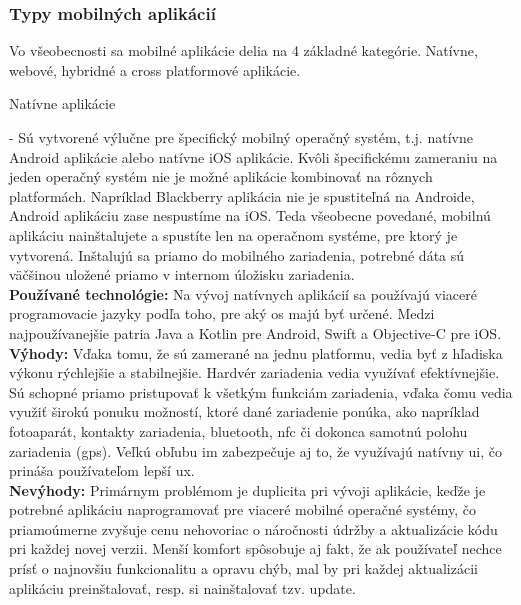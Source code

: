 \subsubsection{Typy mobilných aplikácií}
\label{sec:typy aplikacii}
Vo všeobecnosti sa mobilné aplikácie delia na 4 základné kategórie. Natívne, webové, hybridné a cross platformové aplikácie.
\begin{itemize}[leftmargin=*]
{\bf \item Natívne aplikácie} - Sú vytvorené výlučne pre špecifický mobilný operačný systém, t.j. natívne Android aplikácie alebo natívne iOS aplikácie. Kvôli špecifickému zameraniu na jeden operačný systém nie je možné aplikácie kombinovať na rôznych platformách. Napríklad Blackberry aplikácia nie je spustiteľná na Androide, Android aplikáciu zase nespustíme na iOS. Teda všeobecne povedané, mobilnú aplikáciu nainštalujete a spustíte len na operačnom systéme, pre ktorý je vytvorená. Inštalujú sa priamo do mobilného zariadenia, potrebné dáta sú väčšinou uložené priamo v internom úložisku zariadenia. \cite{ma3} \\

{\bf Používané technológie:} Na vývoj natívnych aplikácií sa používajú viaceré programovacie jazyky podľa toho, pre aký \acrshort{os} majú byť určené. Medzi najpoužívanejšie patria Java a Kotlin pre Android, Swift a Objective-C pre iOS. \\

{\bf Výhody:} Vďaka tomu, že sú zamerané na jednu platformu, vedia byť z hľadiska výkonu rýchlejšie a stabilnejšie. Hardvér zariadenia vedia využívať efektívnejšie. Sú schopné priamo pristupovať k všetkým funkciám zariadenia, vďaka čomu vedia využiť širokú ponuku možností, ktoré dané zariadenie ponúka, ako napríklad fotoaparát, kontakty zariadenia, bluetooth, \acrshort{nfc} či dokonca samotnú polohu zariadenia (\acrshort{gps}). Veľkú obľubu im zabezpečuje aj to, že využívajú natívny \acrshort{ui}, čo prináša používateľom lepší \acrshort{ux}. \cite{ma3} \\
 
{\bf Nevýhody:} Primárnym problémom je duplicita pri vývoji aplikácie, keďže je potrebné aplikáciu naprogramovať pre viaceré mobilné operačné systémy, čo priamoúmerne zvyšuje cenu nehovoriac o náročnosti údržby a aktualizácie kódu pri každej novej verzii. Menší komfort spôsobuje aj fakt, že ak používateľ nechce prísť o najnovšiu funkcionalitu a opravu chýb, mal by pri každej aktualizácii aplikáciu preinštalovať, resp. si nainštalovať tzv. update. \cite{ma3} \\


\end{itemize}
